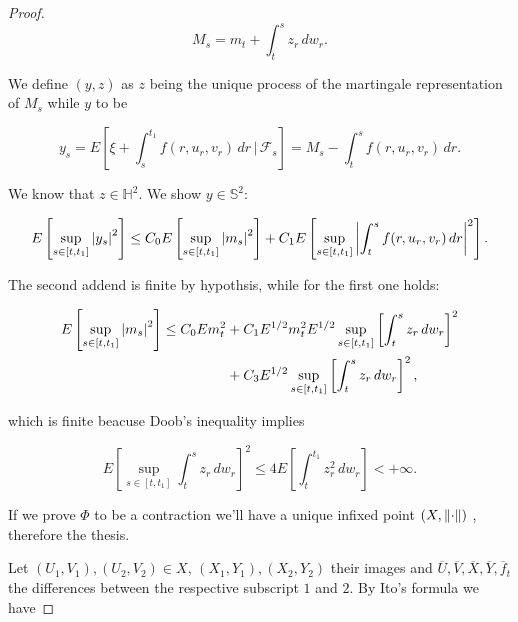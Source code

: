 \begin{theorem}
\begin{proof}
        \begin{equation}
            M_s = m_t + \int_t^{s} z_r\,dw_r.
        \end{equation}

        We define $(y,z)$ as $z$ being the unique process of the martingale representation of $M_s$ while $y$ to be

        \begin{equation}
            y_s = E\left[\xi + \int_s^{t_1} f(r,u_r,v_r)\,dr\,|\,\mathcal{F}_s\right] = M_s - \int_t^s f(r,u_r,v_r)\,dr.
        \end{equation}

        We know that $z\in\mathbb{H}^2$. We show $y\in\mathbb{S}^2$:

        \begin{equation}
            E\left[\sup_{s\in[t,t_1]}\abs{y_s}^2\right] \leq C_0E\left[\sup_{s\in[t,t_1]}\abs{m_s}^2\right] + C_1E\left[\sup_{s\in[t,t_1]}\abs{\int_t^s f(r,u_r,v_r)\,dr}^2\right].
        \end{equation}

        The second addend is finite by hypothsis, while for the first one holds:

        \begin{align*}
            E\left[\sup_{s\in[t,t_1]}\abs{m_s}^2\right] \leq C_0 Em_t^2 & + C_1E^{1/2}m_t^2E^{1/2}\sup_{s\in[t,t_1]}\left[\int_t^{s}z_r\,dw_r\right]^2 \\
            & +C_3E^{1/2}\sup_{s\in[t,t_1]}\left[\int_t^{s}z_r\,dw_r\right]^2,
        \end{align*}

        which is finite beacuse Doob's inequality implies

        \[E\left[\sup_{s\in[t,t_1]}\int_t^sz_r\,dw_r\right]^2 \leq 4E\left[\int_t^{t_1}z_r^2\,dw_r\right]<+\infty.\]

        If we prove $\Phi$ to be a contraction we'll have a unique infixed point $(X,\norm{\cdot})$ , therefore the thesis. 
        
        Let $(U_1,V_1),(U_2,V_2)\in X$, $(X_1,Y_1),(X_2,Y_2)$ their images and $\overline{U},\overline{V},\overline{X},\overline{Y},\overline{f}_t$ the differences between the respective subscript $1$ and $2$. 
        By Ito's formula we have


\end{proof}
\end{theorem}
